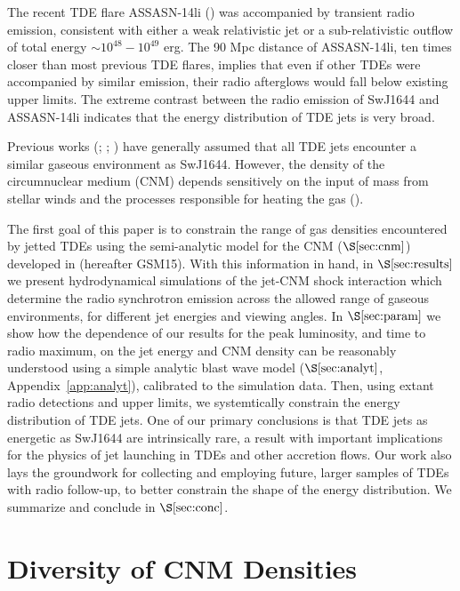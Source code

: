 \documentclass[usenatbib,fleqn]{mnras}
\begin{document}
The recent TDE flare ASSASN-14li (\citealt{Holoien+2016a}) was
accompanied by transient radio emission, consistent with either a weak
relativistic jet \citep{van-Velzen+2015} or a sub-relativistic outflow
\citep{Alexander+2015,Krolik+16} of total energy $\sim
10^{48}-10^{49}$ erg.  The 90 Mpc distance of ASSASN-14li, ten
times closer than most previous TDE flares, implies that even if other
TDEs were accompanied by similar emission, their radio afterglows
would fall below existing upper limits.  The extreme contrast between
the radio emission of SwJ1644 and ASSASN-14li indicates that the
energy distribution of TDE jets is very broad.

Previous works (\citealt{Bower+2013}; \citealt{van-Velzen+2013};
\citealt{Mimica+2015}) have generally assumed that all TDE jets
encounter a similar gaseous environment as SwJ1644.  However, the
density of the circumnuclear medium (CNM) depends sensitively on the
input of mass from stellar winds and the processes responsible for
heating the gas (\citealt{Quataert2004,Generozov+2015}). 

The first goal of this paper is to constrain the range of gas
densities encountered by jetted TDEs using the semi-analytic model for
the CNM ($\S\ref{sec:cnm}$) developed in \citet{Generozov+2015}
(hereafter GSM15).  With this information in hand, in
$\S\ref{sec:results}$ we present hydrodynamical simulations of the
jet-CNM shock interaction which determine the radio synchrotron
emission across the allowed range of gaseous environments, for
different jet energies and viewing angles.  In $\S\ref{sec:param}$ we
show how the dependence of our results for the peak luminosity, and
time to radio maximum, on the jet energy and CNM density can be
reasonably understood using a simple analytic blast wave model
($\S\ref{sec:analyt}$, Appendix~\ref{app:analyt}), calibrated to the
simulation data.  Then, using extant radio detections and upper
limits, we systemtically constrain the energy distribution of TDE
jets.  One of our primary conclusions is that TDE jets as energetic as
SwJ1644 are intrinsically rare, a result with important implications
for the physics of jet launching in TDEs and other accretion flows.
Our work also lays the groundwork for collecting and employing future,
larger samples of TDEs with radio follow-up, to better constrain the
shape of the energy distribution.  We summarize and conclude in
$\S\ref{sec:conc}$.

\section{Diversity of CNM Densities}
\label{sec:cnm}
\end{document}

